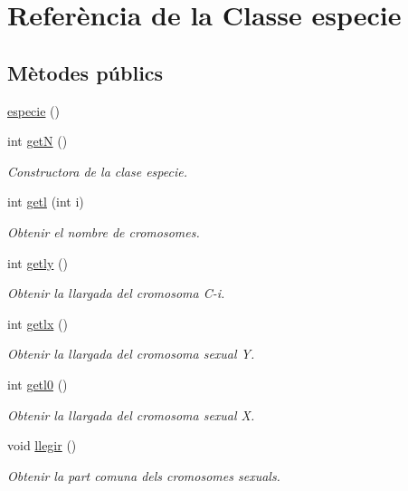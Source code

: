 \hypertarget{classespecie}{}\section{Referència de la Classe especie}
\label{classespecie}
\subsection*{Mètodes públics}
\begin{DoxyCompactItemize}
\item 
\hyperlink{classespecie_ac172ff6414744de38a9995de5b8960e6}{especie} ()
\item 
int \hyperlink{classespecie_a16cbac301660254cf39ef7f51690e507}{getN} ()
\begin{DoxyCompactList}\small\item\em Constructora de la clase especie. \end{DoxyCompactList}\item 
int \hyperlink{classespecie_ac09e154b4eae25155af3bdc98c2a18c3}{getl} (int i)
\begin{DoxyCompactList}\small\item\em Obtenir el nombre de cromosomes. \end{DoxyCompactList}\item 
int \hyperlink{classespecie_aeae1b17938e4527858ad4d3f5949d182}{getly} ()
\begin{DoxyCompactList}\small\item\em Obtenir la llargada del cromosoma C-\/i. \end{DoxyCompactList}\item 
int \hyperlink{classespecie_a98735feb10fd44e1316708566790ca95}{getlx} ()
\begin{DoxyCompactList}\small\item\em Obtenir la llargada del cromosoma sexual Y. \end{DoxyCompactList}\item 
int \hyperlink{classespecie_a5ea723fe64398cd46cbc6e044b114fff}{getl0} ()
\begin{DoxyCompactList}\small\item\em Obtenir la llargada del cromosoma sexual X. \end{DoxyCompactList}\item 
void \hyperlink{classespecie_af1a08ff40fdb79abb1d78c06b8131306}{llegir} ()
\begin{DoxyCompactList}\small\item\em Obtenir la part comuna dels cromosomes sexuals. \end{DoxyCompactList}\end{DoxyCompactItemize}


